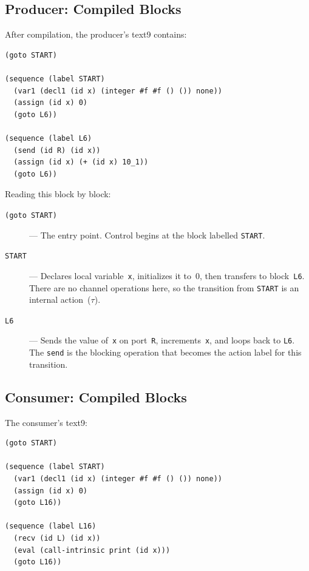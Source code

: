 \documentclass[11pt]{article}
\begin{document}
\subsection{Producer: Compiled Blocks}

After compilation, the producer's text9 contains:

\begin{Verbatim}[samepage=true,xleftmargin=2em]
(goto START)

(sequence (label START)
  (var1 (decl1 (id x) (integer #f #f () ()) none))
  (assign (id x) 0)
  (goto L6))

(sequence (label L6)
  (send (id R) (id x))
  (assign (id x) (+ (id x) 10_1))
  (goto L6))
\end{Verbatim}

Reading this block by block:

\begin{description}
\item[\texttt{(goto START)}] --- The entry point.  Control begins at
  the block labelled \texttt{START}.

\item[\texttt{START}] --- Declares local variable~\texttt{x},
  initializes it to~0, then transfers to block~\texttt{L6}.
  There are no channel operations here, so the transition from
  \texttt{START} is an internal action~($\tau$).

\item[\texttt{L6}] --- Sends the value of~\texttt{x} on
  port~\texttt{R}, increments~\texttt{x}, and loops back to
  \texttt{L6}.  The \texttt{send} is the blocking operation that
  becomes the action label for this transition.
\end{description}

\subsection{Consumer: Compiled Blocks}

The consumer's text9:

\begin{Verbatim}[samepage=true,xleftmargin=2em]
(goto START)

(sequence (label START)
  (var1 (decl1 (id x) (integer #f #f () ()) none))
  (assign (id x) 0)
  (goto L16))

(sequence (label L16)
  (recv (id L) (id x))
  (eval (call-intrinsic print (id x)))
  (goto L16))
\end{Verbatim}
\end{document}
